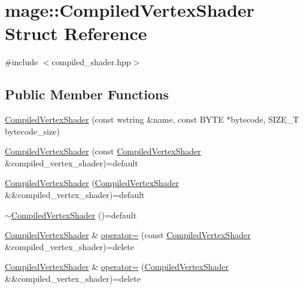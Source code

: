 \hypertarget{structmage_1_1_compiled_vertex_shader}{}\section{mage\+:\+:Compiled\+Vertex\+Shader Struct Reference}
\label{structmage_1_1_compiled_vertex_shader}


{\ttfamily \#include $<$compiled\+\_\+shader.\+hpp$>$}

\subsection*{Public Member Functions}
\begin{DoxyCompactItemize}
\item 
\hyperlink{structmage_1_1_compiled_vertex_shader_abb08e4d5269937f0d9741ac0f748896f}{Compiled\+Vertex\+Shader} (const wstring \&name, const B\+Y\+TE $\ast$bytecode, S\+I\+Z\+E\+\_\+T bytecode\+\_\+size)
\item 
\hyperlink{structmage_1_1_compiled_vertex_shader_a7f8f7294f285ae5fdaf9726939c0b2e3}{Compiled\+Vertex\+Shader} (const \hyperlink{structmage_1_1_compiled_vertex_shader}{Compiled\+Vertex\+Shader} \&compiled\+\_\+vertex\+\_\+shader)=default
\item 
\hyperlink{structmage_1_1_compiled_vertex_shader_a9101da0cf1f08e55d33bfadda3e98f94}{Compiled\+Vertex\+Shader} (\hyperlink{structmage_1_1_compiled_vertex_shader}{Compiled\+Vertex\+Shader} \&\&compiled\+\_\+vertex\+\_\+shader)=default
\item 
\hyperlink{structmage_1_1_compiled_vertex_shader_af909e9e38ec2eef93a77aeac993e4755}{$\sim$\+Compiled\+Vertex\+Shader} ()=default
\item 
\hyperlink{structmage_1_1_compiled_vertex_shader}{Compiled\+Vertex\+Shader} \& \hyperlink{structmage_1_1_compiled_vertex_shader_a9ce8c846d9c29ffd67a19cffd362b709}{operator=} (const \hyperlink{structmage_1_1_compiled_vertex_shader}{Compiled\+Vertex\+Shader} \&compiled\+\_\+vertex\+\_\+shader)=delete
\item 
\hyperlink{structmage_1_1_compiled_vertex_shader}{Compiled\+Vertex\+Shader} \& \hyperlink{structmage_1_1_compiled_vertex_shader_ae42ff3528b8a4b58c3d9f085d0d4573e}{operator=} (\hyperlink{structmage_1_1_compiled_vertex_shader}{Compiled\+Vertex\+Shader} \&\&compiled\+\_\+vertex\+\_\+shader)=delete
\end{DoxyCompactItemize}
